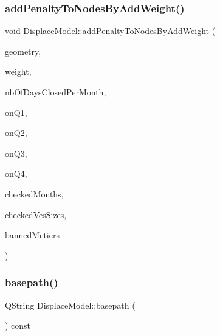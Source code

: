 \mbox{\label{class_displace_model_ae7d7e49c4a36522007010a2a55d61a82}} 
\subsubsection{\texorpdfstring{addPenaltyToNodesByAddWeight()}{addPenaltyToNodesByAddWeight()}\hspace{0.1cm}{\footnotesize\ttfamily [2/2]}}
{\footnotesize\ttfamily void Displace\+Model\+::add\+Penalty\+To\+Nodes\+By\+Add\+Weight (\begin{DoxyParamCaption}\item[{O\+G\+R\+Geometry $\ast$}]{geometry,  }\item[{double}]{weight,  }\item[{double}]{nb\+Of\+Days\+Closed\+Per\+Month,  }\item[{bool}]{on\+Q1,  }\item[{bool}]{on\+Q2,  }\item[{bool}]{on\+Q3,  }\item[{bool}]{on\+Q4,  }\item[{vector$<$ bool $>$}]{checked\+Months,  }\item[{const vector$<$ int $>$ \&}]{checked\+Ves\+Sizes,  }\item[{vector$<$ int $>$}]{banned\+Metiers }\end{DoxyParamCaption})}

\mbox{\label{class_displace_model_aa8fa2854364ea575cd28871442314b66}} 
\subsubsection{\texorpdfstring{basepath()}{basepath()}}
{\footnotesize\ttfamily Q\+String Displace\+Model\+::basepath (\begin{DoxyParamCaption}{ }\end{DoxyParamCaption}) const\hspace{0.3cm}{\ttfamily [inline]}}

\mbox{\label{class_displace_model_adffd25632efe6d81c61b36582f693296}} 
